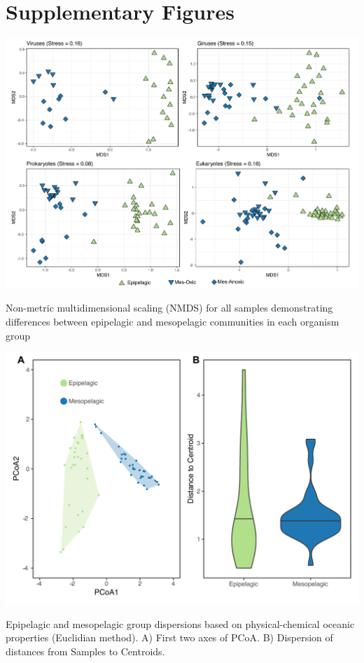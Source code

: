 \documentclass[fleqn,10pt]{wlscirep}
\begin{document}
\clearpage

\section*{Supplementary Figures}

\begin{suppfigure}[ht]
    \centering
    \includegraphics[scale=0.4]{images/nmds_used_SF_to_print.pdf}
    \caption{Non-metric multidimensional scaling (NMDS) for all samples demonstrating differences between epipelagic and mesopelagic communities in each organism group}
    \label{fig:nmds}
\end{suppfigure}
\begin{suppfigure}[ht]
    \centering
    \includegraphics[scale=0.5]{images/betadisp_diganose_to_print.pdf}
    \caption{Epipelagic and mesopelagic group dispersions based on physical-chemical oceanic properties (Euclidian method). A) First two axes of PCoA. B) Dispersion of distances from Samples to Centroids.}
    \label{fig:betadipersion}
\end{suppfigure}
\end{document}
